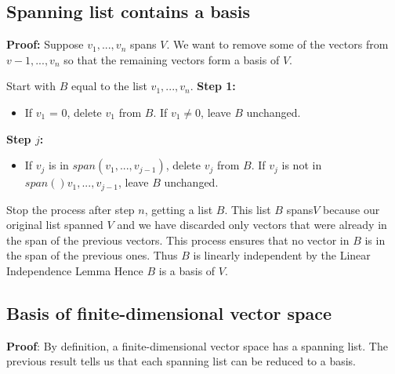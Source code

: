 \documentclass{report}
\begin{document}
\subsection{Spanning list contains a basis}

\textbf{Proof:}\newline
Suppose $v_1,...,v_n$ spans $V$. We want to remove some of the vectors from $v-1,...,v_n$ so that the remaining vectors form a basis of $V$.\newline\newline

Start with $B$ equal to the list $v_1,...,v_n$.\newline
\textbf{Step 1:}
\begin{itemize}
    \item If $v_1$ = 0, delete $v_1$ from $B$. If $v_1 \neq 0$, leave $B$ unchanged.
\end{itemize}

\textbf{Step $j$:}
\begin{itemize}
    \item If $v_j$ is in $span(v_1,...,v_{j-1})$, delete $v_j$ from $B$. If $v_j$ is not in $span()v_1,...,v_{j-1}$, leave $B$ unchanged.
\end{itemize}

Stop the process after step $n$, getting a list $B$. This list $B$ spans$V$ because our original list spanned $V$ and we have discarded only vectors that were already in the span of the previous vectors.\newline
This process ensures that no vector in $B$ is in the span of the previous ones.\newline
Thus $B$ is linearly independent by the Linear Independence Lemma Hence $B$ is a basis of $V$.

\subsection{Basis of finite-dimensional vector space}

\textbf{Proof}: By definition, a finite-dimensional vector space has a spanning list. The previous result tells us that each spanning list can be reduced to a basis.
\end{document}
